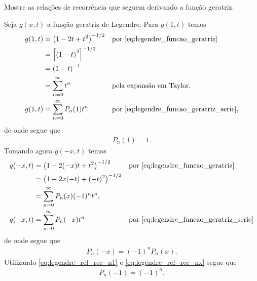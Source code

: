 \documentclass[a4paper,12pt, leqno, answers]{exam}
\begin{document}
\begin{questions}
    \question[P2 de 2012] Mostre as rela\c{c}\~{o}es de recorr\^{e}ncia que seguem derivando a fun\c{c}\~{a}o geratriz.
    \begin{solution}
        Seja $g(x, t)$ a fun\c{c}\~{a}o geratriz de Legendre. Para $g(1, t)$ temos
        \begin{align*}
            g(1, t) &= \left( 1 - 2 t + t^2 \right)^{-1/2} && \text{por \eqref{eq:legendre_funcao_geratriz}} \\
            &= \left[ \left( 1 - t \right)^2 \right]^{-1/2} \\
            &= \left( 1 - t \right)^{-1} \\
            &= \sum_{n = 0}^\infty t^n && \text{pela expans\~{a}o em Taylor}, \\
            g(1, t) &= \sum_{n = 0}^\infty P_n(1) t^n && \text{por \eqref{eq:legendre_funcao_geratriz_serie},}
        \end{align*}
        de onde segue que
        \begin{align}
            P_n(1) = 1. \label{eq:legendre_rel_rec_n1}
        \end{align}
        Tomando agora $g(-x, t)$ temos
        \begin{align*}
            g(-x, t) &= \left( 1 - 2 (-x) t + t^2 \right)^{-1/2} && \text{por \eqref{eq:legendre_funcao_geratriz}} \\
            &= \left( 1 - 2 x (-t) + (-t)^2 \right)^{-1/2} \\
            &= \sum_{n = 0}^\infty P_n(x) (-1)^n t^n, \\
            g(-x, t) &= \sum_{n = 0}^\infty P_n(-x) t^n && \text{por \eqref{eq:legendre_funcao_geratriz_serie}}
        \end{align*}
        de onde segue que
        \begin{align}
            P_n(-x) = (-1)^n P_n(x). \label{eq:legendre_rel_rec_nx}
        \end{align}
        Utilizando \eqref{eq:legendre_rel_rec_n1} e \eqref{eq:legendre_rel_rec_nx} segue que
        \begin{align*}
            P_n(-1) = (-1)^n.
        \end{align*}


\end{solution}
\end{questions}
\end{document}
